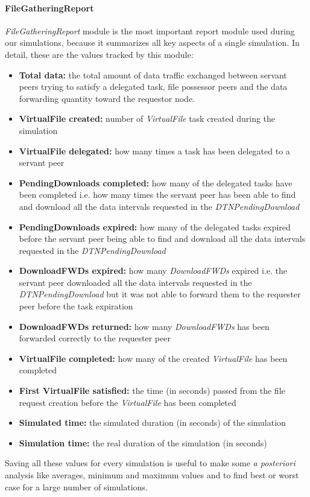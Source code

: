 \paragraph{FileGatheringReport}
\textit{FileGatheringReport} module is the most important report module used during our simulations, because it summarizes all key aspects of a single simulation. In detail, these are the values tracked by this module:
\begin{itemize}
\item \textbf{Total data:}	the total amount of data traffic exchanged between servant peers trying to satisfy a delegated task, file possessor peers and the data forwarding quantity toward the requestor node.
\item \textbf{VirtualFile created:}	number of \textit{VirtualFile} task created during the simulation
\item \textbf{VirtualFile delegated:} how many times a task has been delegated to a servant peer
\item \textbf{PendingDownloads completed:} how many of the delegated tasks have been completed i.e. how many times the servant peer has been able to find and download all the data intervals requested in the \textit{DTNPendingDownload} 
\item \textbf{PendingDownloads expired:} how many of the delegated tasks expired before the servant peer being able to find and download all the data intervals requested in the \textit{DTNPendingDownload} 
\item \textbf{DownloadFWDs expired:} how many \textit{DownloadFWDs} expired i.e. the servant peer downloaded all the data intervals requested in the \textit{DTNPendingDownload} but it was not able to forward them to the requester peer before the task expiration
\item \textbf{DownloadFWDs returned:} how many \textit{DownloadFWDs} has been forwarded correctly to the requester peer
\item \textbf{VirtualFile completed:} how many of the created \textit{VirtualFile} has been completed
\item \textbf{First VirtualFile satisfied:}	the time (in seconds) passed from the file request creation before the \textit{VirtualFile} has been completed
\item \textbf{Simulated time:} the simulated duration (in seconds) of the simulation
\item \textbf{Simulation time:}	the real duration of the simulation (in seconds)
\end{itemize}
Saving all these values for every simulation is useful to make some \textit{a posteriori} analysis like averages, minimum and maximum values and to find best or worst case for a large number of simulations.

